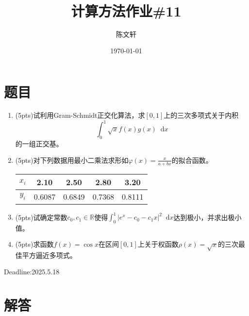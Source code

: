 \documentclass[cn,hazy,green,11pt,normal]{elegantnote}
\title{计算方法作业\#11}
\author{陈文轩}
\institute{KFRC}
\date{\today}
\newcommand*{\diff}{\mathop{}\!\mathrm{d}}
\begin{document}
\maketitle

\section{题目}


\begin{enumerate}

    \item (5pts)试利用Gram-Schmidt正交化算法，求$[0,1]$上的三次多项式关于内积\[\int_0^1\sqrt{x}f(x)g(x)\diff x\]的一组正交基。

    \item (5pts)对下列数据用最小二乘法求形如$\varphi(x)=\frac{x}{a+bx}$的拟合函数。

        \begin{table}[H]
            \centering
            \begin{tabular}{|c|c|c|c|c|}
                \hline
                $x_i$ & 2.10 & 2.50 & 2.80 & 3.20 \\
                \hline
                $y_i$ & 0.6087 & 0.6849 & 0.7368 & 0.8111 \\
                \hline
            \end{tabular}
            \label{tab:1}
        \end{table}

    \item (5pts)试确定常数$c_0,c_1\in\mathbb{R}$使得$\int_0^1| e^x-c_0-c_1 x|^2\diff x$达到极小，并求出极小值。

    \item (5pts)求函数$f(x)=\cos x$在区间$[0,1]$上关于权函数$\rho(x)=\sqrt{x}$的三次最佳平方逼近多项式。
\end{enumerate}

    Deadline:2025.5.18

\section{解答}
\end{document}
